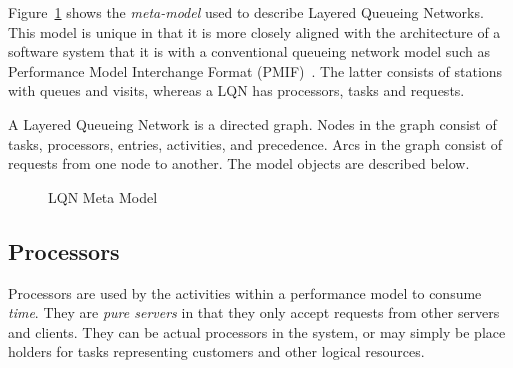 Figure~\ref{fig:meta-model} shows the
\emph{meta-model} used to describe Layered Queueing
Networks.  This model is unique in
that it is more closely aligned with the architecture of a software
system that it is with a conventional queueing network model such as
Performance Model Interchange
Format
(PMIF)~\cite{perf:smith-99-jss-pmif,perf:smith-2004-pmif2}.  The latter consists of
stations with queues and visits, whereas a LQN has processors, tasks
and requests.

A Layered Queueing Network is a directed graph.  Nodes in the
graph consist of tasks,
processors, entries,
activities, and precedence.
Arcs in the graph consist of requests from
one node to another.  The model objects are described below.

\begin{figure}[htbp]
  \centering
  \caption{LQN Meta Model}
  \label{fig:meta-model}
\end{figure}

\subsection{Processors}
\label{sec:processors}

Processors are used by the
activities within a performance model to consume
\emph{time}.  They are \emph{pure servers} in that
they only accept requests from other servers and clients.  They can be
actual processors in the system, or may simply be place holders for
tasks representing customers and other logical resources.

